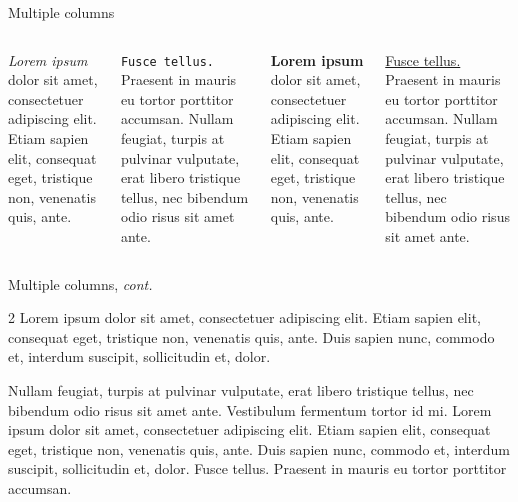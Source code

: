 \documentclass[aspectratio=1610]{beamer}
\begin{document}
\begin{frame}{Multiple columns}
    \begin{columns}
        \textit{Lorem ipsum} dolor sit amet, consectetuer adipiscing elit. Etiam sapien elit, consequat eget, tristique non, venenatis quis, ante.
        \bigskip
        
        \texttt{Fusce tellus.} Praesent in mauris eu tortor porttitor accumsan. Nullam feugiat, turpis at pulvinar vulputate, erat libero tristique tellus, nec bibendum odio risus sit amet ante.

        \textbf{Lorem ipsum} dolor sit amet, consectetuer adipiscing elit. Etiam sapien elit, consequat eget, tristique non, venenatis quis, ante.
        \bigskip
        
        \underline{Fusce tellus.} Praesent in mauris eu tortor porttitor accumsan. Nullam feugiat, turpis at pulvinar vulputate, erat libero tristique tellus, nec bibendum odio risus sit amet ante.
    \end{columns}
    \note{~}
\end{frame}


\begin{frame}{Multiple columns, \textit{cont.}}
    \begin{multicols}{2}
        Lorem ipsum dolor sit amet, consectetuer adipiscing elit. Etiam sapien elit, consequat eget, tristique non, venenatis quis, ante. Duis sapien nunc, commodo et, interdum suscipit, sollicitudin et, dolor.
        \columnbreak
        
        Nullam feugiat, turpis at pulvinar vulputate, erat libero tristique tellus, nec bibendum odio risus sit amet ante. Vestibulum fermentum tortor id mi. Lorem ipsum dolor sit amet, consectetuer adipiscing elit. Etiam sapien elit, consequat eget, tristique non, venenatis quis, ante. Duis sapien nunc, commodo et, interdum suscipit, sollicitudin et, dolor. Fusce tellus. Praesent in mauris eu tortor porttitor accumsan.
    \end{multicols}
    \note{~}
\end{frame}

\end{document}
